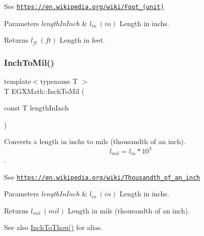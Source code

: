 See \href{https://en.wikipedia.org/wiki/Foot_(unit)}{\tt https\+://en.\+wikipedia.\+org/wiki/\+Foot\+\_\+(unit)} 
\begin{DoxyParams}{Parameters}
{\em length\+In\+Inch} & $ l_{in}\ (in)$ Length in inchs. \\
\hline
\end{DoxyParams}
\begin{DoxyReturn}{Returns}
$ l_{ft}\ (ft)$ Length in feet. 
\end{DoxyReturn}
\mbox{\label{group___e_g_x_math-_conversions-_length_conversions-_imperial-_inch-_imperial_ga87110f96478b747855d7c022ad06818b}} 
\subsubsection{\texorpdfstring{Inch\+To\+Mil()}{InchToMil()}}
{\footnotesize\ttfamily template$<$typename T $>$ \\
T E\+G\+X\+Math\+::\+Inch\+To\+Mil (\begin{DoxyParamCaption}\item[{const T}]{length\+In\+Inch }\end{DoxyParamCaption})}



Converts a length in inchs to mils (thousandth of an inch). \[ l_{mil}=l_{in} * 10^{3} \]. 

See \href{https://en.wikipedia.org/wiki/Thousandth_of_an_inch}{\tt https\+://en.\+wikipedia.\+org/wiki/\+Thousandth\+\_\+of\+\_\+an\+\_\+inch} 
\begin{DoxyParams}{Parameters}
{\em length\+In\+Inch} & $ l_{in}\ (in)$ Length in inchs. \\
\hline
\end{DoxyParams}
\begin{DoxyReturn}{Returns}
$ l_{mil}\ (mil)$ Length in mils (thousandth of an inch). 
\end{DoxyReturn}
\begin{DoxySeeAlso}{See also}
\mbox{\hyperlink{group___e_g_x_math-_conversions-_length_conversions-_imperial-_inch-_imperial_ga2f69d70d71ea01a37e6b8c97c0a95204}{Inch\+To\+Thou()}} for alias. 
\end{DoxySeeAlso}
\mbox{\label{group___e_g_x_math-_conversions-_length_conversions-_imperial-_inch-_imperial_gabd202023ddba57d2cf3f7a142aa62bf8}} 
